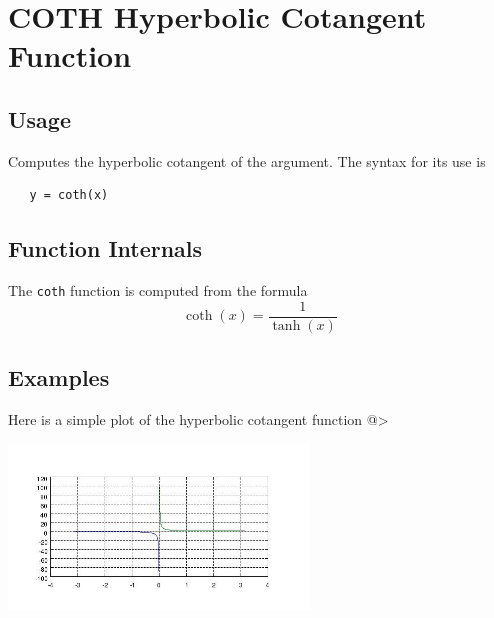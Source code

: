 \section{COTH Hyperbolic Cotangent Function}

\subsection{Usage}

Computes the hyperbolic cotangent of the argument.
The syntax for its use is
\begin{verbatim}
   y = coth(x)
\end{verbatim}
\subsection{Function Internals}

The \verb|coth| function is computed from the formula
\[
   \coth(x) = \frac{1}{\tanh(x)}
\]
\subsection{Examples}

Here is a simple plot of the hyperbolic cotangent function
@>


\centerline{\includegraphics[width=8cm]{cothplot}}

